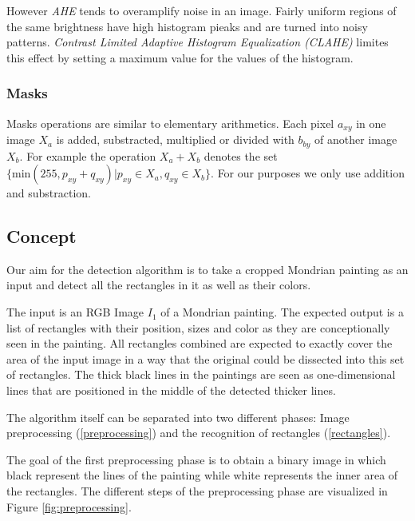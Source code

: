 \documentclass[serif,article,noparskip]{agse-thesis}
\begin{document}
However \textit{AHE} tends to overamplify noise in an image. Fairly uniform
regions of the same brightness have high histogram pieaks and are turned into
noisy patterns.  \textit{Contrast Limited Adaptive Histogram Equalization
(CLAHE)} limites this effect by setting a maximum value for the values of the
histogram. \cite{Pizer1987}

\subsubsection{Masks}

Masks operations are similar to elementary arithmetics. Each pixel $a_{xy}$ in
one image  $X_a$ is added, substracted, multiplied or divided with $b_{by}$ of
another image $X_b$. For example the operation $X_a + X_b$ denotes the set
$\{\mathrm{min}(255, p_{xy} + q_{xy}) | p_{xy} \in X_a, q_{xy} \in X_b\}$. For our purposes we only
use addition and substraction.


\subsection{Concept} \label{concept}


Our aim for the detection algorithm is to take a cropped Mondrian painting as
an input and detect all the rectangles in it as well as their colors.

The input is an RGB Image $I_1$ of a Mondrian painting. The expected output is a
list of rectangles with their position, sizes and color as they are
conceptionally seen in the painting. All rectangles combined are expected to
exactly cover the area of the input image in a way that the original could be
dissected into this set of rectangles. The thick black lines in the paintings
are seen as one-dimensional lines that are positioned in the middle of the
detected thicker lines.

The algorithm itself can be separated into two different phases: Image
preprocessing (\ref{preprocessing}) and the recognition of rectangles (\ref{rectangles}).

The goal of the first preprocessing phase is to obtain a binary image in which
black represent the lines of the painting while white represents the inner area
of the rectangles. The different steps of the preprocessing phase are visualized
in Figure \ref{fig:preprocessing}.
\end{document}
